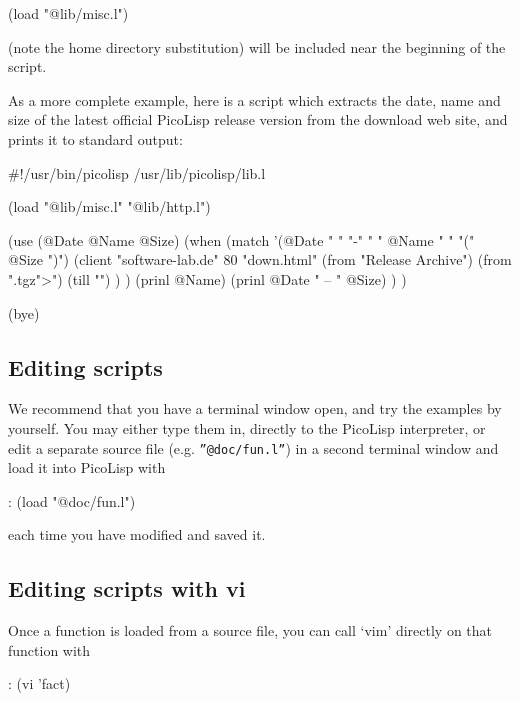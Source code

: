 \begin{wideverbatim}
(load "@lib/misc.l")
\end{wideverbatim}

(note the home directory substitution) will be included near the
beginning of the script.

As a more complete example, here is a script which extracts the date,
name and size of the latest official PicoLisp release version from the
download web site, and prints it to standard output:


\begin{wideverbatim}
#!/usr/bin/picolisp /usr/lib/picolisp/lib.l

(load "@lib/misc.l" "@lib/http.l")

(use (@Date @Name @Size)
   (when
      (match
         '(@Date " " "-" " " @Name " " "(" @Size ")")
         (client "software-lab.de" 80 "down.html"
            (from "Release Archive")
            (from ".tgz">")
            (till "") ) )
      (prinl @Name)
      (prinl @Date " -- " @Size) ) )

(bye)
\end{wideverbatim}

 
\subsection{Editing scripts}
\label{sec:tut-editing-scripts}


We recommend that you have a terminal window open, and try the examples
by yourself. You may either type them in, directly to the PicoLisp
interpreter, or edit a separate source file (e.g. \texttt{''@doc/fun.l''}) in a
second terminal window and load it into PicoLisp with


\begin{wideverbatim}
: (load "@doc/fun.l")
\end{wideverbatim}

each time you have modified and saved it.

 
\subsection{Editing scripts with vi}
\label{sec:tut-editing-scripts-with-vi}


Once a function is loaded from a source file, you can call `vim'
directly on that function with


\begin{wideverbatim}
: (vi 'fact)
\end{wideverbatim}

